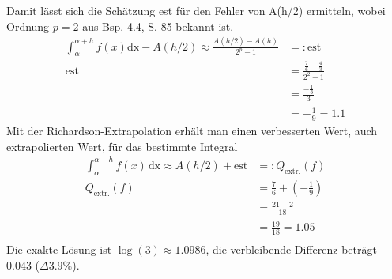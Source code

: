 \documentclass[10pt,a4paper]{article}
\begin{document}
	Damit lässt sich die Schätzung est für den Fehler von A(h/2) ermitteln, wobei Ordnung $p=2$ aus Bsp. 4.4, S. 85 bekannt ist.
	\begin{align*}
		\int_{\alpha}^{\alpha+h}f(x)\text{dx}-A(h/2)\approx \frac{A(h/2)-A(h)}{2^p-1}&=:\text{est} \tag{4.92, S. 100} \\
		\text{est}&=\frac{\frac{7}{6}-\frac{4}{3}}{2^2-1} \\
		&=\frac{-\frac{1}{3}}{3} \\
		&=-\frac{1}{9} = 1.\dot{1}
	\end{align*}
	Mit der Richardson-Extrapolation erhält man einen verbesserten Wert, auch extrapolierten Wert, für das bestimmte Integral
	\begin{align*}
		\int_{\alpha}^{\alpha+h}f(x)\,\text{dx}\approx A(h/2)+\text{est}&=:Q_{\text{extr.}}(f) \\
		Q_{\text{extr.}}(f)&=\frac{7}{6}+\left(-\frac{1}{9} \right) \\
		&=\frac{21-2}{18} \\
		&=\frac{19}{18}=1.0\dot{5} \\
	\end{align*}
	Die exakte Lösung ist $\log(3)\approx1.0986$, die verbleibende Differenz beträgt $0.043$ ($\Delta3.9\%$).
\end{document}
